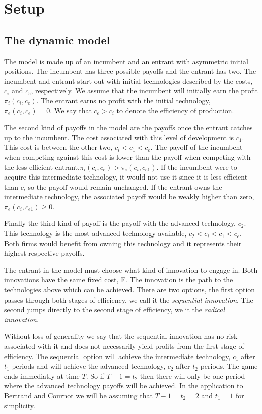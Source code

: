 \section{Setup}\label{setup}


\subsection{The dynamic model}\label{dynamic}

The model is made up of an incumbent and an entrant with asymmetric initial positions. The incumbent has three possible payoffs and the entrant has two. The incumbent and entrant start out with initial technologies described by the costs, $c_i$ and $c_e$, respectively. We assume that the incumbent will initially earn the profit $\pi_i(c_i,c_e)$. The entrant earns no profit with the initial technology, $\pi_e(c_i,c_e)=0$. We say that $c_e>c_i$ to denote the efficiency of production. 

The second kind of payoffs in the model are the payoffs once the entrant catches up to the incumbent. The cost associated with this level of development is $c_{1}$. This cost is between the other two, $c_i<c_{1}<c_e$. The payoff of the incumbent when competing against this cost is lower than the payoff when competing with the less efficient entrant,$ \pi_i( c_i,c_{e}) > \pi_i( c_i, c_{e1} )$. If the incumbent were to acquire this intermediate technology, it would not use it since it is less efficient than $c_i$ so the payoff would remain unchanged. If the entrant owns the intermediate technology, the associated payoff would be weakly higher than zero, $\pi_e(c_i,c_{e1}) \geq 0$.

Finally the third kind of payoff is the payoff with the advanced technology, $c_2$. This technology is the most advanced technology available, $c_2<c_i<c_1<c_e$. Both firms would benefit from owning this technology and it represents their highest respective payoffs. 

The entrant in the model must choose what kind of innovation to engage in. Both innovations have the same fixed cost, F. The innovation is the path to the technologies above which can be achieved. There are two options, the first option passes through both stages of efficiency, we call it the \textit{sequential innovation}. The second jumps directly to the second stage of efficiency, we it the \textit{radical innovation}.  

Without loss of generality we say that the sequential innovation has no risk associated with it and does not necessarily yield profits from the first stage of efficiency. The sequential option will achieve the intermediate technology, $c_1$ after $t_1$ periods and will achieve the advanced technology, $c_2$ after $t_2$ periods. The game ends immediatly at time $T$. So if $T-1=t_2$ then there will only be one period where the advanced technology payoffs will be achieved. In the application to Bertrand and Cournot we will be assuming that $T-1=t_2=2$ and $t_1=1$ for simplicity. 

